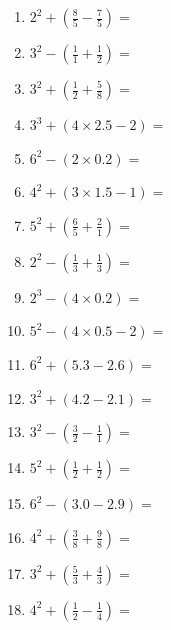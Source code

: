 \documentclass[12pt]{article}
\begin{document}
\begin{enumerate}
\newpage
\item \large $ 2^{2} + (\frac{8}{5} - \frac{7}{5}) = $ \vspace{1.4cm}
\item \large $ 3^{2} - (\frac{1}{1} + \frac{1}{2}) = $ \vspace{1.4cm}
\item \large $ 3^{2} + (\frac{1}{2} + \frac{5}{8}) = $ \vspace{1.4cm}
\item \large $ 3^{3} + (4 \times 2.5 - 2) = $ \vspace{1.4cm}
\item \large $ 6^{2} - (2 \times 0.2) = $ \vspace{1.4cm}
\item \large $ 4^{2} + (3 \times 1.5 - 1) = $ \vspace{1.4cm}
\item \large $ 5^{2} + (\frac{6}{5} + \frac{2}{1}) = $ \vspace{1.4cm}
\item \large $ 2^{2} - (\frac{1}{3} + \frac{1}{3}) = $ \vspace{1.4cm}
\item \large $ 2^{3} - (4 \times 0.2) = $ \vspace{1.4cm}
\item \large $ 5^{2} - (4 \times 0.5 - 2) = $ \vspace{1.4cm}
\newpage
\item \large $ 6^{2} + (5.3 - 2.6) = $ \vspace{1.4cm}
\item \large $ 3^{2} + (4.2 - 2.1) = $ \vspace{1.4cm}
\item \large $ 3^{2} - (\frac{3}{2} - \frac{1}{1}) = $ \vspace{1.4cm}
\item \large $ 5^{2} + (\frac{1}{2} + \frac{1}{2}) = $ \vspace{1.4cm}
\item \large $ 6^{2} - (3.0 - 2.9) = $ \vspace{1.4cm}
\item \large $ 4^{2} + (\frac{3}{8} + \frac{9}{8}) = $ \vspace{1.4cm}
\item \large $ 3^{2} + (\frac{5}{3} + \frac{4}{3}) = $ \vspace{1.4cm}
\item \large $ 4^{2} + (\frac{1}{2} - \frac{1}{4}) = $ \vspace{1.4cm}

\end{enumerate}
\end{document}
